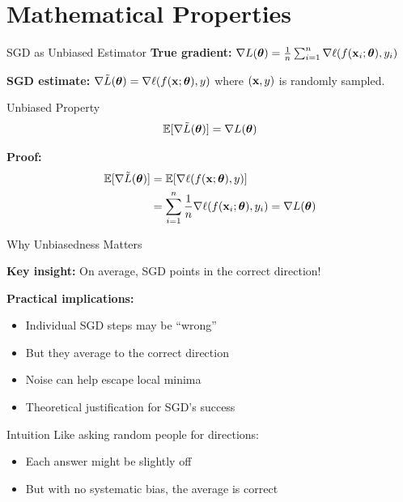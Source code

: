 \documentclass[usenames,dvipsnames]{beamer}
\newcommand{\E}{\mathbb{E}}
\begin{document}
  \section{Mathematical Properties}

  \begin{frame}{SGD as Unbiased Estimator}
    \textbf{True gradient:} $\nabla L(\boldsymbol{\theta}) = \frac{1}{n}\sum_{i=1}^n \nabla \ell(f(\mathbf{x}_i; \boldsymbol{\theta}), y_i)$
    
    \pause
    \textbf{SGD estimate:} $\nabla \tilde{L}(\boldsymbol{\theta}) = \nabla \ell(f(\mathbf{x}; \boldsymbol{\theta}), y)$
    where $(\mathbf{x}, y)$ is randomly sampled.
    
    \pause
    \begin{theorembox}{Unbiased Property}
    $$\E[\nabla \tilde{L}(\vtheta)] = \nabla L(\vtheta)$$
    \end{theorembox}
    
    \pause
    \textbf{Proof:}
    \begin{align*}
        \E[\nabla \tilde{L}(\vtheta)] &= \E[\nabla \ell(f(\vx; \vtheta), y)]\\
        &= \sum_{i=1}^n \frac{1}{n} \nabla \ell(f(\vx_i; \vtheta), y_i) = \nabla L(\vtheta)
    \end{align*}
  \end{frame}

  \begin{frame}{Why Unbiasedness Matters}
    \begin{keypointsbox}
    \textbf{Key insight:} On average, SGD points in the correct direction!
    \end{keypointsbox}
    
    \pause
    \textbf{Practical implications:}
    \begin{itemize}[<+->]
        \item Individual SGD steps may be ``wrong''
        \item But they average to the correct direction
        \item Noise can help escape local minima
        \item Theoretical justification for SGD's success
    \end{itemize}
    
    \pause
    \begin{examplebox}{Intuition}
    Like asking random people for directions:
    \begin{itemize}
        \item Each answer might be slightly off
        \item But with no systematic bias, the average is correct
    \end{itemize}
    \end{examplebox}
  \end{frame}
\end{document}
